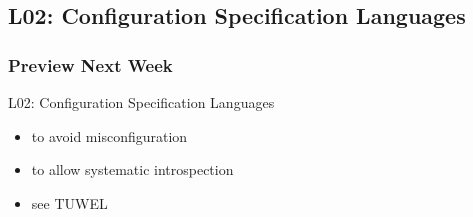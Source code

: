 \subsection{L02: Configuration Specification Languages}

\begin{frame}
	\frametitle{Preview Next Week}

	L02: Configuration Specification Languages

	\begin{itemize}
	\item to avoid misconfiguration
	\item to allow systematic introspection
	\item see TUWEL
	\end{itemize}
\end{frame}


\nocite{raab2017introducing}

\appendix

\begin{frame}[allowframebreaks]
	
	
\end{frame}




